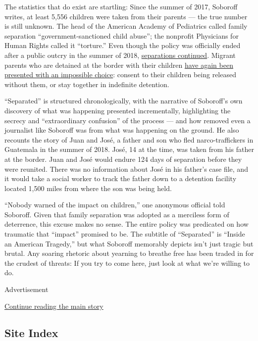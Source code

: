 The statistics that do exist are startling: Since the summer of 2017,
Soboroff writes, at least 5,556 children were taken from their parents
--- the true number is still unknown. The head of the American Academy
of Pediatrics called family separation ``government-sanctioned child
abuse''; the nonprofit Physicians for Human Rights called it
``torture.'' Even though the policy was officially ended after a public
outcry in the summer of 2018,
\href{https://www.nytimes3xbfgragh.onion/2019/07/30/us/migrant-family-separations.html}{separations
continued}. Migrant parents who are detained at the border with their
children
\href{https://www.nbcnews.com/politics/immigration/despite-judge-s-order-migrant-children-remain-detained-amid-covid-n1234705}{have
again been presented with an impossible choice}: consent to their
children being released without them, or stay together in indefinite
detention.

``Separated'' is structured chronologically, with the narrative of
Soboroff's own discovery of what was happening presented incrementally,
highlighting the secrecy and ``extraordinary confusion'' of the process
--- and how removed even a journalist like Soboroff was from what was
happening on the ground. He also recounts the story of Juan and José, a
father and son who fled narco-traffickers in Guatemala in the summer of
2018. José, 14 at the time, was taken from his father at the border.
Juan and José would endure 124 days of separation before they were
reunited. There was no information about José in his father's case file,
and it would take a social worker to track the father down to a
detention facility located 1,500 miles from where the son was being
held.

``Nobody warned of the impact on children,'' one anonymous official told
Soboroff. Given that family separation was adopted as a merciless form
of deterrence, this excuse makes no sense. The entire policy was
predicated on how traumatic that ``impact'' promised to be. The subtitle
of ``Separated'' is ``Inside an American Tragedy,'' but what Soboroff
memorably depicts isn't just tragic but brutal. Any soaring rhetoric
about yearning to breathe free has been traded in for the crudest of
threats: If you try to come here, just look at what we're willing to do.

Advertisement

\protect\hyperlink{after-bottom}{Continue reading the main story}

\hypertarget{site-index}{%
\subsection{Site Index}\label{site-index}}

